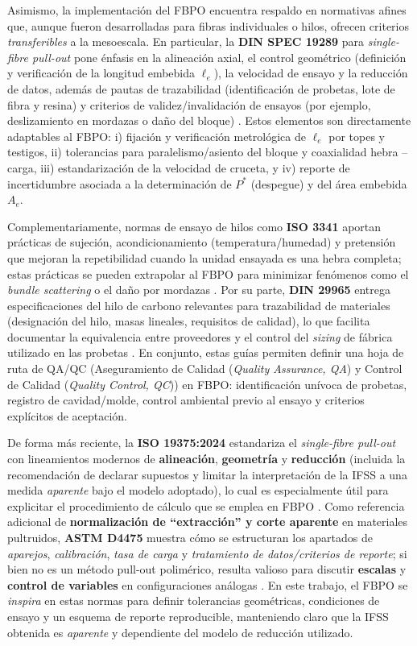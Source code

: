 Asimismo, la implementación del FBPO encuentra respaldo en normativas afines que, aunque fueron
desarrolladas para fibras individuales o hilos, ofrecen criterios \emph{transferibles} a la mesoescala.
En particular, la \textbf{DIN SPEC 19289} para \emph{single-fibre pull-out} pone énfasis en la
alineación axial, el control geométrico (definición y verificación de la longitud
embebida \(\ell_e\)), la velocidad de ensayo y la reducción de datos, además de
pautas de trazabilidad (identificación de probetas, lote de fibra y resina) y
criterios de validez/invalidación de ensayos (por ejemplo, deslizamiento en mordazas o daño
del bloque) \cite{DINSPEC19289}. Estos elementos son directamente adaptables al FBPO: i) fijación y
verificación metrológica de \(\ell_e\) por topes y testigos, ii) tolerancias para paralelismo/asiento
del bloque y coaxialidad hebra – carga, iii) estandarización de la velocidad de cruceta, y 
iv) reporte de incertidumbre asociada a la determinación de \(P^{\ast}\) (despegue) y del área
embebida \(A_e\).

Complementariamente, normas de ensayo de hilos como \textbf{ISO 3341} aportan prácticas de
sujeción, acondicionamiento (temperatura/humedad) y pretensión que mejoran
la repetibilidad cuando la unidad ensayada es una hebra completa; estas prácticas se pueden
extrapolar al FBPO para minimizar fenómenos como el \emph{bundle scattering} o el daño por
mordazas \cite{ISO3341}. Por su parte, \textbf{DIN 29965} entrega
especificaciones del hilo de carbono relevantes para trazabilidad de materiales
(designación del hilo, masas lineales, requisitos de calidad), lo que facilita documentar la equivalencia
entre proveedores y el control del \textit{sizing} de fábrica utilizado en las probetas \cite{DIN29965}.
En conjunto, estas guías permiten definir una hoja de ruta de QA/QC (Aseguramiento de Calidad
(\textit{Quality Assurance, QA}) y Control de Calidad (\textit{Quality Control, QC})) en FBPO:
identificación unívoca de probetas, registro de cavidad/molde, control ambiental previo al ensayo
y criterios explícitos de aceptación.

De forma más reciente, la \textbf{ISO 19375:2024} estandariza el \emph{single-fibre pull-out} con
lineamientos modernos de \textbf{alineación}, \textbf{geometría} y \textbf{reducción} (incluida la
recomendación de declarar supuestos y limitar la interpretación de la IFSS a una medida \emph{aparente}
bajo el modelo adoptado), lo cual es especialmente útil para explicitar el procedimiento de cálculo
que se emplea en FBPO \cite{ISO19375}. Como referencia adicional de
\textbf{normalización de “extracción” y corte aparente} en materiales pultruidos, \textbf{ASTM D4475}
muestra cómo se estructuran los apartados de \emph{aparejos}, \emph{calibración}, \emph{tasa de carga}
y \emph{tratamiento de datos/criterios de reporte}; si bien no es un método pull-out polimérico,
resulta valioso para discutir \textbf{escalas} y \textbf{control de variables} en configuraciones
análogas \cite{ASTMD4475}. En este trabajo, el FBPO se \emph{inspira} en estas normas para definir
tolerancias geométricas, condiciones de ensayo y un esquema de reporte reproducible, manteniendo claro
que la IFSS obtenida es \emph{aparente} y dependiente del modelo de reducción utilizado.

